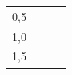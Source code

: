 {{\begin{center}
\begin{xtabular}[t]{|l|l|l|l|}
        0,5 &
    
    
         &
    
    
         &
    
    
     \tabularnewline{}
    
    
        1,0 &
    
    
         &
    
    
         &
    
    
     \tabularnewline{}
    
    
        1,5 &
    

\end{xtabular}
\end{center}}}
